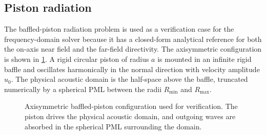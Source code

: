 \documentclass[final,num,12pt]{elsarticle}
\begin{document}
\subsection{Piston radiation}
The baffled-piston radiation problem is used as a verification case for the
frequency-domain solver because it has a closed-form analytical reference for
both the on-axis near field and the far-field directivity.  The axisymmetric
configuration is shown in \cref{fig:piston}.  A rigid circular piston of radius
$a$ is mounted in an infinite rigid baffle and oscillates harmonically in the
normal direction with velocity amplitude $u_0$.  The physical acoustic domain
is the half-space above the baffle, truncated numerically by a spherical PML
between the radii $R_{\min}$ and $R_{\max}$.
\begin{figure}[H]
    \centering
    \caption{Axisymmetric baffled-piston configuration used for verification.
    The piston drives the physical acoustic domain, and outgoing waves are
    absorbed in the spherical PML surrounding the domain.}
    \label{fig:piston}
\end{figure}
\end{document}

